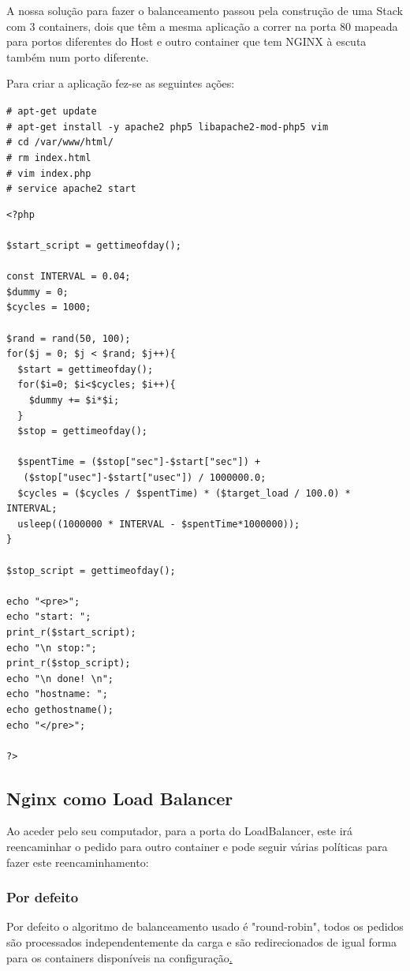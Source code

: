 \documentclass[pdftex,12pt,a4paper]{report}
\newcommand{\shellcmd}[1]{\indent\indent\texttt{\footnotesize\# #1}\\}
\begin{document}
A nossa solução para fazer o balanceamento passou pela construção de uma Stack com 3 containers, dois que têm a mesma aplicação a correr na porta 80 mapeada para portos diferentes do Host e outro container que tem NGINX à escuta também num porto diferente.

Para criar a aplicação fez-se as seguintes ações:

\shellcmd{apt-get update}
\shellcmd{apt-get install -y apache2 php5 libapache2-mod-php5 vim}
\shellcmd{cd /var/www/html/}
\shellcmd{rm index.html}
\shellcmd{vim index.php}
\shellcmd{service apache2 start}

\begin{lstlisting}
<?php

$start_script = gettimeofday();

const INTERVAL = 0.04;
$dummy = 0;
$cycles = 1000;

$rand = rand(50, 100);
for($j = 0; $j < $rand; $j++){
  $start = gettimeofday();
  for($i=0; $i<$cycles; $i++){
    $dummy += $i*$i;
  }
  $stop = gettimeofday();

  $spentTime = ($stop["sec"]-$start["sec"]) +
   ($stop["usec"]-$start["usec"]) / 1000000.0;
  $cycles = ($cycles / $spentTime) * ($target_load / 100.0) * INTERVAL;
  usleep((1000000 * INTERVAL - $spentTime*1000000));
}

$stop_script = gettimeofday();

echo "<pre>";
echo "start: ";
print_r($start_script);
echo "\n stop:";
print_r($stop_script);
echo "\n done! \n";
echo "hostname: ";
echo gethostname();
echo "</pre>";

?>
\end{lstlisting}

\subsection{Nginx como Load Balancer}

Ao aceder pelo seu computador, para a porta do LoadBalancer, este irá reencaminhar o pedido para outro container e pode seguir várias políticas para fazer este reencaminhamento:

\subsubsection{Por defeito}
Por defeito o algoritmo de balanceamento usado é "round-robin", todos os pedidos são processados independentemente da carga e são redirecionados de igual forma para os containers disponíveis na configuração\href{http://nginx.org/en/docs/http/load_balancing.html}.
\end{document}
